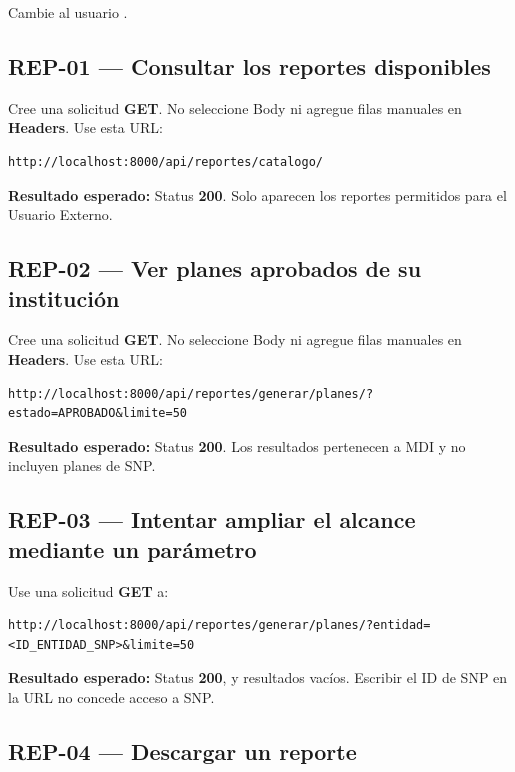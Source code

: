 \documentclass[11pt,a4paper]{article}
\newcommand{\esperado}[1]{\textcolor{VerdeResultado}{\textbf{Resultado esperado:}} #1}
\begin{document}
Cambie al usuario .

\subsection{REP-01 --- Consultar los reportes disponibles}

Cree una solicitud \textbf{GET}. No seleccione Body ni agregue filas manuales en \textbf{Headers}. Use esta URL:

\begin{lstlisting}
http://localhost:8000/api/reportes/catalogo/
\end{lstlisting}

\esperado{Status \textbf{200}. Solo aparecen los reportes permitidos para el Usuario Externo.}

\subsection{REP-02 --- Ver planes aprobados de su institución}

Cree una solicitud \textbf{GET}. No seleccione Body ni agregue filas manuales en \textbf{Headers}. Use esta URL:

\begin{lstlisting}
http://localhost:8000/api/reportes/generar/planes/?estado=APROBADO&limite=50
\end{lstlisting}

\esperado{Status \textbf{200}. Los resultados pertenecen a MDI y no incluyen planes de SNP.}

\subsection{REP-03 --- Intentar ampliar el alcance mediante un parámetro}

Use una solicitud \textbf{GET} a:

\begin{lstlisting}
http://localhost:8000/api/reportes/generar/planes/?entidad=<ID_ENTIDAD_SNP>&limite=50
\end{lstlisting}

\esperado{Status \textbf{200},  y resultados vacíos. Escribir el ID de SNP en la URL no concede acceso a SNP.}

\subsection{REP-04 --- Descargar un reporte}
\end{document}
